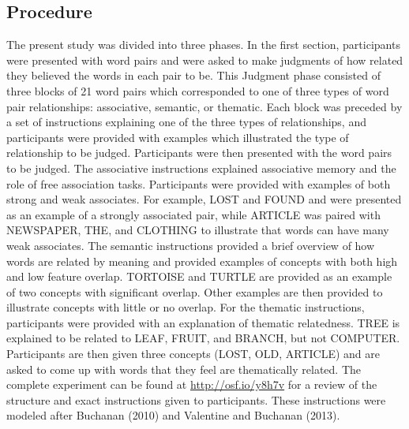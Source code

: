 \documentclass[english,man]{apa6}
\theoremstyle{definition}
\theoremstyle{definition}
\theoremstyle{remark}
\begin{document}
\subsection{Procedure}\label{procedure}

The present study was divided into three phases. In the first section,
participants were presented with word pairs and were asked to make
judgments of how related they believed the words in each pair to be.
This Judgment phase consisted of three blocks of 21 word pairs which
corresponded to one of three types of word pair relationships:
associative, semantic, or thematic. Each block was preceded by a set of
instructions explaining one of the three types of relationships, and
participants were provided with examples which illustrated the type of
relationship to be judged. Participants were then presented with the
word pairs to be judged. The associative instructions explained
associative memory and the role of free association tasks. Participants
were provided with examples of both strong and weak associates. For
example, LOST and FOUND and were presented as an example of a strongly
associated pair, while ARTICLE was paired with NEWSPAPER, THE, and
CLOTHING to illustrate that words can have many weak associates. The
semantic instructions provided a brief overview of how words are related
by meaning and provided examples of concepts with both high and low
feature overlap. TORTOISE and TURTLE are provided as an example of two
concepts with significant overlap. Other examples are then provided to
illustrate concepts with little or no overlap. For the thematic
instructions, participants were provided with an explanation of thematic
relatedness. TREE is explained to be related to LEAF, FRUIT, and BRANCH,
but not COMPUTER. Participants are then given three concepts (LOST, OLD,
ARTICLE) and are asked to come up with words that they feel are
thematically related. The complete experiment can be found at
\url{http://osf.io/y8h7v} for a review of the structure and exact
instructions given to participants. These instructions were modeled
after Buchanan (2010) and Valentine and Buchanan (2013).
\end{document}
